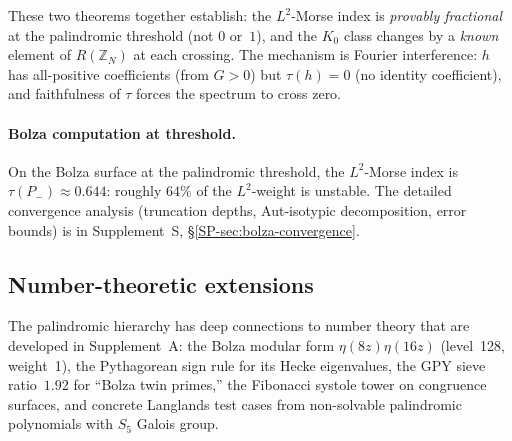 \noindent
These two theorems together establish: the $L^2$-Morse
index is \emph{provably fractional} at the palindromic
threshold (not $0$ or~$1$), and the $K_0$ class changes by a
\emph{known} element of $R(\mathbb{Z}_N)$ at each crossing.
The mechanism is Fourier interference: $h$ has all-positive
coefficients (from $G > 0$) but $\tau(h) = 0$ (no identity
coefficient), and faithfulness of $\tau$ forces the spectrum
to cross zero.

\paragraph{Bolza computation at threshold.}
On the Bolza surface at the palindromic threshold,
the $L^2$-Morse index is $\tau(P_-) \approx 0.644$:
roughly $64\%$ of the $L^2$-weight is unstable.
The detailed convergence analysis (truncation depths,
Aut-isotypic decomposition, error bounds) is in
Supplement~S, \S\ref*{SP-sec:bolza-convergence}.


\subsection{Number-theoretic extensions}
\label{sec:number-theory-extensions}

The palindromic hierarchy has deep connections to number theory
that are developed in Supplement~A:
the Bolza modular form $\eta(8z)\eta(16z)$ (level~128, weight~1),
the Pythagorean sign rule for its Hecke eigenvalues,
the GPY sieve ratio~$1.92$ for ``Bolza twin primes,''
the Fibonacci systole tower on congruence surfaces,
and concrete Langlands test cases from non-solvable palindromic
polynomials with $S_5$ Galois group.





